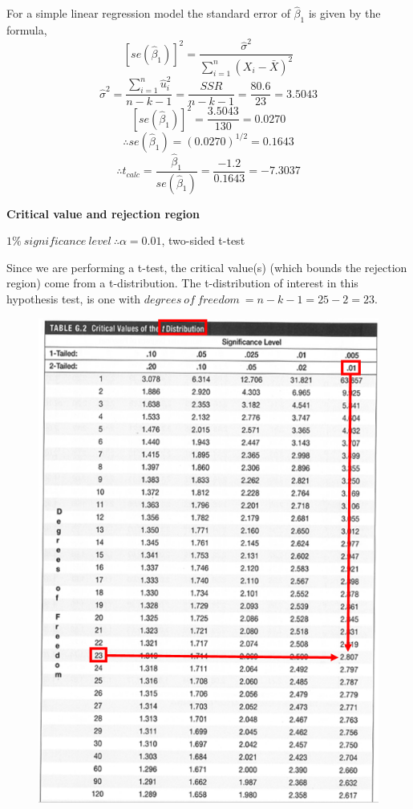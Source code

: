 \documentclass[12pt]{report}
\begin{document}
\noindent For a simple linear regression model the standard error of $\hat{\beta}_1$ is given by the formula,
$$[se(\hat{\beta}_1)]^2 = \dfrac{\hat{\sigma}^2}{\sum_{i=1}^{n}(X_i - \bar{X})^2}$$
$$\hat{\sigma}^2 = \dfrac{\sum_{i=1}^{n}\hat{u}_i^2}{n-k-1} = \dfrac{SSR}{n-k-1} = \dfrac{80.6}{23} = 3.5043$$
$$[se(\hat{\beta}_1)]^2 = \dfrac{3.5043}{130} = 0.0270$$
$$\therefore se(\hat{\beta}_1) = (0.0270)^{1/2} = 0.1643$$
$$\therefore t_{calc} = \dfrac{\hat{\beta}_1}{se(\hat{\beta}_1)} = \dfrac{-1.2}{0.1643} = -7.3037$$

\noindent \textbf{Critical value and rejection region}

\noindent $1\%\ significance\ level\ \therefore \alpha = 0.01$, two-sided t-test

\noindent Since we are performing a t-test, the critical value(s) (which bounds the rejection region) come from a t-distribution. The t-distribution of interest in this hypothesis test, is one with $degrees\ of\ freedom\ = n - k - 1 = 25 - 2 = 23$. 
\begin{figure}[H]
	\centering
	\includegraphics{tute6_q1_1}
\end{figure}
\end{document}
